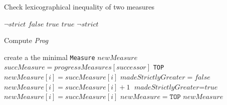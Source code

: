 \documentclass[10pt,a4paper]{article}
\begin{document}
\begin{algorithm}
\caption{Check lexicographical inequality of two measures}\label{alg:lexico}
\begin{algorithmic}[1]
				\State \Return $\neg strict$
			\Else
				\State \Return $\textit{false}$
			\EndIf
		\Else
				\State \Return $\textit{true}$
			\Else
						\State \Return $\textit{true}$
					\EndIf
				\EndFor
				\State \Return $\neg strict$
			\EndIf
		\EndIf
	\EndProcedure
\end{algorithmic}
\end{algorithm}

\begin{algorithm}
\caption{Compute \textit{Prog}}\label{alg:prog}
\begin{algorithmic}[1]
		\State create a the minimal \texttt{Measure} $newMeasure$
		\State $succMeasure = progressMeasures[successor]$
			\State \Return \texttt{TOP}
		\EndIf
				\State $newMeasure[i] = succMeasure[i]$
			\EndFor
		\Else
			\State $\textit{madeStrictlyGreater} = false$
					\State $newMeasure[i] = succMeasure[i] + 1$
                	\State $\textit{madeStrictlyGreater} = \textit{true}$
                \Else
                	\State $newMeasure[i] = succMeasure[i]$
                \EndIf
            \EndFor
        		\State $newMeasure = \texttt{TOP}$
       		\EndIf
       	\EndIf
       	\State \Return $newMeasure$
	\EndProcedure
\end{algorithmic}
\end{algorithm}
\end{document}
